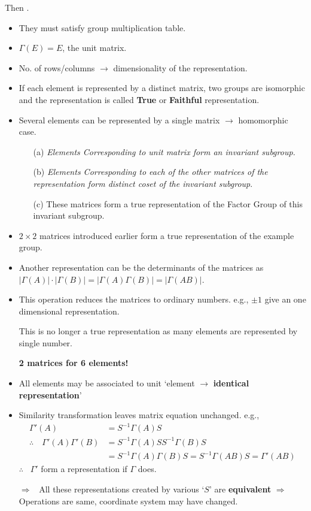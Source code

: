 Then .
\begin{itemize}
\item They must satisfy group multiplication table.

\item $\Gamma(E)=E$, the unit matrix.

\item No. of rows/columns $\to$ dimensionality of the representation.

\item If each element is represented by a distinct matrix, two groups are isomorphic and the representation is called {\bf True} or {\bf Faithful} representation.

\item Several elements can be represented by a single matrix $\to$ homomorphic case.
\begin{itemize}
\item[(a)] {\em Elements Corresponding to unit matrix form an invariant subgroup.}

\item[(b)] {\em Elements Corresponding to each of the other matrices of the representation form distinct coset of the invariant subgroup}.

\item[(c)] These matrices form a true representation of the Factor Group of this invariant subgroup.
\end{itemize}

\item $2\times 2$ matrices introduced earlier form a true representation of the example group.

\item Another representation can be the determinants of the matrices as $|\Gamma(A)|\cdot |\Gamma(B)|=|\Gamma(A)\Gamma(B)|=|\Gamma(AB)|$.

\item This operation reduces the matrices to ordinary numbers. e.g., $\pm 1$ give an one dimensional representation.

This is no longer a true representation as many elements are represented by single number.

{\bf 2 matrices for 6 elements!}

\item All elements may be associated to unit `element $\to$ {\bf identical representation}'

\item Similarity transformation leaves matrix equation unchanged. e.g.,
\begin{align*}
\Gamma'(A) &= S^{-1}\Gamma(A)S\\[2pt]
\therefore\quad \Gamma'(A)\Gamma'(B) &= S^{-1}\Gamma(A)SS^{-1}\Gamma(B)S\\[2pt]
 &= S^{-1}\Gamma(A)\Gamma(B)S=S^{-1}\Gamma(AB)S=\Gamma'(AB)
\end{align*}
$\therefore$ \ $\Gamma'$ form a representation if $\Gamma$ does.

$\Rightarrow$ \ All these representations created by various `$S$' are {\bf equivalent} $\Rightarrow$ Operations are same, coordinate system may have changed.
\end{itemize}

